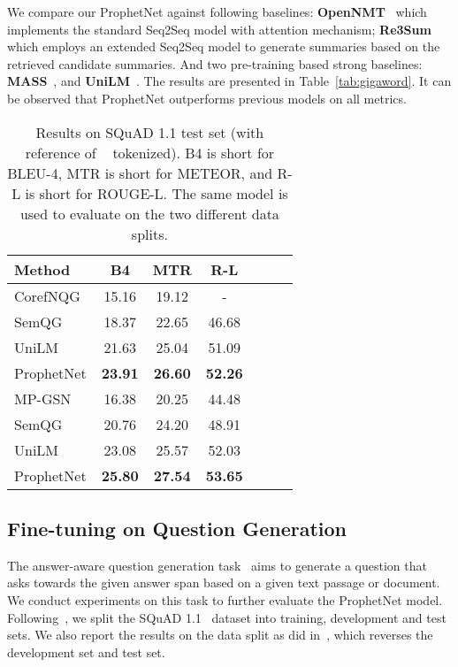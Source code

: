 \documentclass[11pt,a4paper]{article}
\begin{document}
We compare our ProphetNet against following baselines:
\textbf{OpenNMT}~\cite{klein2017opennmt} which implements the standard Seq2Seq model with attention mechanism;
\textbf{Re3Sum}~\cite{cao2018retrieve} which employs an extended Seq2Seq model to generate summaries based on the retrieved candidate summaries.
And two pre-training based strong baselines:  \textbf{MASS}~\cite{song2019mass}, and \textbf{UniLM}~\cite{dong2019unified}.
The results are presented in Table~\ref{tab:gigaword}.
It can be observed that ProphetNet outperforms previous models on all metrics.




\begin{table}[th] 
\small
\begin{center}
  \begin{tabular}{lcccccl} 
    \toprule
    Method & B4 & MTR & R-L \\
    \midrule
 CorefNQG\scriptsize{~\cite{du2018harvesting}} & 15.16 & 19.12 & - \\
 SemQG\scriptsize{~\cite{zhang2019addressing}} & 18.37 & 22.65 & 46.68 \\
 UniLM\scriptsize{~\cite{dong2019unified}} & 21.63    &25.04&   51.09\\
  ProphetNet &   \textbf{23.91}  & \textbf{26.60}   & \textbf{52.26}\\ \hline
 MP-GSN\scriptsize{~\cite{zhao2018paragraph}} & 16.38 & 20.25 & 44.48 \\
  SemQG\scriptsize{~\cite{zhang2019addressing}} & 20.76 & 24.20 & 48.91 \\
 UniLM\scriptsize{~\cite{dong2019unified}} & 23.08    &25.57&   52.03\\
 ProphetNet &   \textbf{25.80}  & \textbf{27.54}   & \textbf{53.65}\\
  \bottomrule
\end{tabular}
\end{center}
\caption{Results on SQuAD 1.1 test set (with reference of ~\citet{du2017learning} tokenized). B4 is short for BLEU-4, MTR is short for METEOR, and R-L is short for ROUGE-L. The same model is used to evaluate on the two different data splits.} \label{tab:squad-recover}
\end{table}


\subsection{Fine-tuning on Question Generation}\label{sec:exp3}
The answer-aware question generation task~\cite{zhou2017neural} aims to generate a question that asks towards the given answer span based on a given text passage or document.
We conduct experiments on this task to further evaluate the ProphetNet model.  Following~\citet{du2017learning}, we split the SQuAD 1.1~\cite{rajpurkar2016squad} dataset into training, development and test sets. We also report the results on the data split as did in~\citet{zhao2018paragraph}, which reverses the development set and test set.
\end{document}
